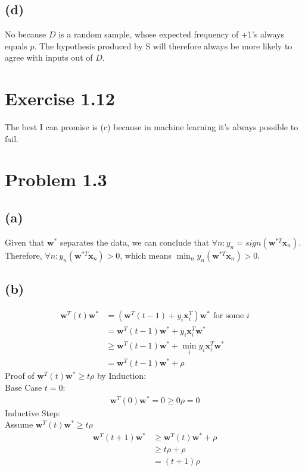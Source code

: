 \documentclass{article}
\begin{document}
	\subsection*{(d)}
		No because $D$ is a random sample, whose expected frequency of +1's always equals $p$. The hypothesis produced by S will therefore always be more likely to agree with inputs out of $D$.
		
	\section*{Exercise 1.12}
		The best I can promise is (c) because in machine learning it's always possible to fail.
		
	\section*{Problem 1.3}
	\subsection*{(a)}
		Given that $\mathbf w^*$ separates the data, we can conclude that $\forall n: y_n = sign(\mathbf w^{*T}\mathbf x_n)$.\\
		Therefore, $\forall n: y_n(\mathbf w^{*T}\mathbf x_n) > 0$, which means $\min_n y_n(\mathbf w^{*T}\mathbf x_n) > 0$.
		
	\subsection*{(b)}
		\begin{align*}
			\mathbf w^T(t)\mathbf w^* &= (\mathbf w^T(t-1) + y_i\mathbf x^T_i)\mathbf w^*\text{ for some }i\\
			&= \mathbf w^T(t-1)\mathbf w^* + y_i\mathbf x^T_i\mathbf w^*\\
			&\geq \mathbf w^T(t-1)\mathbf w^* + \min_i y_i\mathbf x^T_i\mathbf w^*\\
			&= \mathbf w^T(t-1)\mathbf w^* + \rho
		\end{align*}
		Proof of $\mathbf w^T(t)\mathbf w^* \geq t\rho$ by Induction:\\
		Base Case $t = 0$:
		\begin{align*}
			\mathbf w^T(0)\mathbf w^* = 0 \geq 0\rho = 0
		\end{align*}
		Inductive Step:\\
		Assume $\mathbf w^T(t)\mathbf w^* \geq t\rho$
		\begin{align*}
			\mathbf w^T(t+1)\mathbf w^* &\geq \mathbf w^T(t)\mathbf w^* + \rho\\
			&\geq t\rho + \rho\\
			&= (t+1)\rho
		\end{align*}
		
\end{document}
